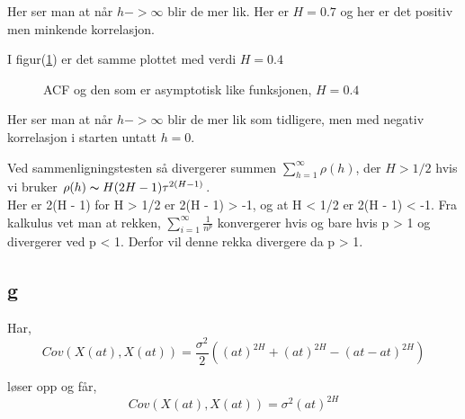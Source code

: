 \documentclass[10pt]{article}
\begin{document}
{Her ser man at når $h -> \infty$ blir de mer lik. Her er $H = 0.7$ og her er det positiv men minkende korrelasjon.

I figur(\ref{asymp2}) er det samme plottet med verdi $H = 0.4$

\begin{figure}[hbt!]
\caption{ACF og den som er asymptotisk like funksjonen, $H = 0.4$}
\label{asymp2}
\end{figure}

Her ser man at når $h -> \infty$ blir de mer lik som tidligere, men med negativ korrelasjon i starten untatt $h = 0$.

Ved sammenligningstesten så divergerer summen $\sum_{h = 1}^{\infty} \rho(h)$, der $H > 1/2$ hvis vi bruker $\rho(h) \thicksim H(2H-1)\tau^{2(H-1)}$.\\
Her er 2(H - 1) for H > 1/2 er 2(H - 1) > -1, og at H < 1/2 er 2(H - 1) < -1. Fra kalkulus vet man at rekken, $ \sum_{i = 1}^{\infty} \frac{1}{n^{p}}$ konvergerer hvis og bare hvis p > 1 og divergerer ved p < 1. Derfor vil denne rekka divergere da p > 1.

\subsection{g}
Har,
\begin{equation}
Cov(X(at),X(at)) = \frac{\sigma^2}{2}((at)^{2H} + (at)^{2H} - ( at - at)^{2H})
\end{equation}

løser opp og får,
\begin{equation}
  Cov(X(at),X(at)) = \sigma^2(at)^{2H}
  \end{equation}

}
\end{document}
